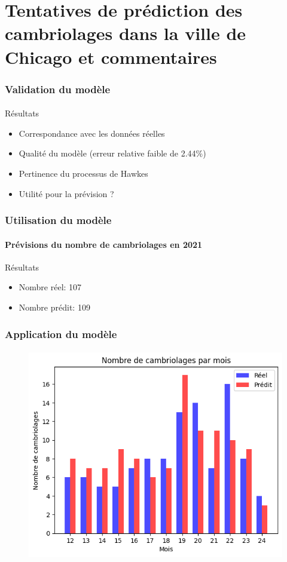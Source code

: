 \section[Validation]{Tentatives de prédiction des cambriolages dans la ville de Chicago et commentaires}

\begin{frame}
    \frametitle{Validation du modèle}
    \framesubtitle{}
    \begin{block}{Résultats}
         \begin{itemize}
            \item Correspondance avec les données réelles
            \item Qualité du modèle (erreur relative faible de 2.44\%)
            \item Pertinence du processus de Hawkes
            \item Utilité pour la prévision ?
            \end{itemize}
  
  \end{block}    
\end{frame}

\begin{frame}
    \frametitle{Utilisation du modèle}
    \framesubtitle{Prévisions du nombre de cambriolages en 2021}
    \begin{block}{Résultats}
         \begin{itemize}
            \item Nombre réel: 107 
            \item Nombre prédit: 109
            \end{itemize}
  \end{block}    
\end{frame}

\begin{frame}
    \frametitle{Application du modèle}
    \framesubtitle{}
        \begin{figure}
            \centering
            \includegraphics[width=0.6\linewidth]{figures/téléchargement (4).png}
        \end{figure}
\end{frame}

